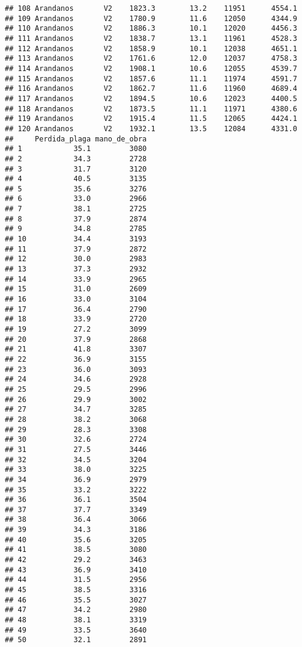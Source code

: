 \documentclass[]{book}
\begin{document}
\begin{verbatim}
## 108 Arandanos       V2    1823.3        13.2    11951      4554.1
## 109 Arandanos       V2    1780.9        11.6    12050      4344.9
## 110 Arandanos       V2    1886.3        10.1    12020      4456.3
## 111 Arandanos       V2    1838.7        13.1    11961      4528.3
## 112 Arandanos       V2    1858.9        10.1    12038      4651.1
## 113 Arandanos       V2    1761.6        12.0    12037      4758.3
## 114 Arandanos       V2    1908.1        10.6    12055      4539.7
## 115 Arandanos       V2    1857.6        11.1    11974      4591.7
## 116 Arandanos       V2    1862.7        11.6    11960      4689.4
## 117 Arandanos       V2    1894.5        10.6    12023      4400.5
## 118 Arandanos       V2    1873.5        11.1    11971      4380.6
## 119 Arandanos       V2    1915.4        11.5    12065      4424.1
## 120 Arandanos       V2    1932.1        13.5    12084      4331.0
##     Perdida_plaga mano_de_obra
## 1            35.1         3080
## 2            34.3         2728
## 3            31.7         3120
## 4            40.5         3135
## 5            35.6         3276
## 6            33.0         2966
## 7            38.1         2725
## 8            37.9         2874
## 9            34.8         2785
## 10           34.4         3193
## 11           37.9         2872
## 12           30.0         2983
## 13           37.3         2932
## 14           33.9         2965
## 15           31.0         2609
## 16           33.0         3104
## 17           36.4         2790
## 18           33.9         2720
## 19           27.2         3099
## 20           37.9         2868
## 21           41.8         3307
## 22           36.9         3155
## 23           36.0         3093
## 24           34.6         2928
## 25           29.5         2996
## 26           29.9         3002
## 27           34.7         3285
## 28           38.2         3068
## 29           28.3         3308
## 30           32.6         2724
## 31           27.5         3446
## 32           34.5         3204
## 33           38.0         3225
## 34           36.9         2979
## 35           33.2         3222
## 36           36.1         3504
## 37           37.7         3349
## 38           36.4         3066
## 39           34.3         3186
## 40           35.6         3205
## 41           38.5         3080
## 42           29.2         3463
## 43           36.9         3410
## 44           31.5         2956
## 45           38.5         3316
## 46           35.5         3027
## 47           34.2         2980
## 48           38.1         3319
## 49           33.5         3640
## 50           32.1         2891

\end{verbatim}
\end{document}
